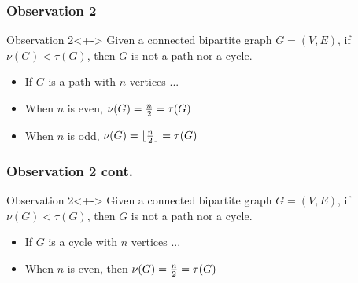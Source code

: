 \documentclass{beamer}
\begin{document}
\begin{frame}
  \frametitle{Observation 2}
  \begin{exampleblock}{Observation 2}<+->
   Given a connected bipartite graph $G=(V,E)$, if $\nu{(G)}<\tau{(G)}$, then $G$ is not a path nor a cycle.
  \end{exampleblock}
  \begin{itemize}[<+->]
  \item If $G$ is a path with $n$ vertices ...
  \item When $n$ is even, $\nu{(G)}={{n}\over{2}}=\tau{(G)}$
    \begin{center}
    \end{center}
  \item When $n$ is odd, $\nu{(G)}=\lfloor{{n}\over{2}}\rfloor=\tau{(G)}$
    \begin{center}
    \end{center}
  \end{itemize}
\end{frame}

\begin{frame}
  \frametitle{Observation 2 cont.}
  \begin{exampleblock}{Observation 2}<+->
   Given a connected bipartite graph $G=(V,E)$, if $\nu{(G)}<\tau{(G)}$, then $G$ is not a path nor a cycle.
  \end{exampleblock}
  \begin{itemize}[<+->]
  \item If $G$ is a cycle with $n$ vertices ...
  \item When $n$ is even, then $\nu{(G)}={{n}\over{2}}=\tau{(G)}$
    \begin{center}
    \end{center}
  \end{itemize}
\end{frame}
\end{document}
